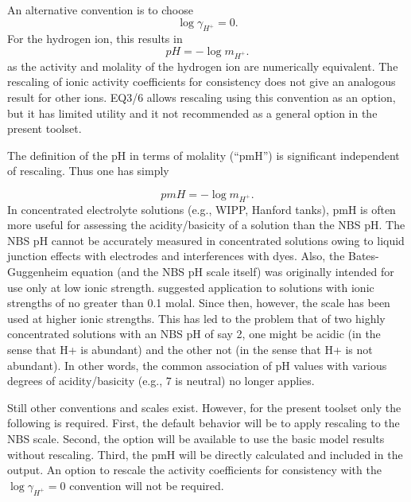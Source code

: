 An alternative convention is to choose
%
\begin{equation}
  \log \gamma _{H^{+}} = 0.
\end{equation}
%
For the hydrogen ion, this results in
% 
\begin{equation}
  pH = -\log m_{H^{+}} .
\end{equation}
%
as the activity and molality of the hydrogen ion are numerically
equivalent. The rescaling of ionic activity coefficients for
consistency does not give an analogous result for other ions. EQ3/6
allows rescaling using this convention as an option, but it has
limited utility and it not recommended as a general option in the
present toolset.

The definition of the pH in terms of molality (``pmH'') is significant independent of rescaling. Thus one has simply

\begin{equation}
  pmH = -\log m_{H^{+} } .
\end{equation}
%
In concentrated electrolyte solutions (e.g., WIPP, Hanford tanks), pmH
is often more useful for assessing the acidity/basicity of a solution
than the NBS pH. The NBS pH cannot be accurately measured in
concentrated solutions owing to liquid junction effects with
electrodes and interferences with dyes. Also, the Bates-Guggenheim
equation (and the NBS pH scale itself) was originally intended for use
only at low ionic strength. \citet{bates-1964} suggested application
to solutions with ionic strengths of no greater than 0.1 molal. Since
then, however, the scale has been used at higher ionic strengths. This
has led to the problem that of two highly concentrated solutions with
an NBS pH of say 2, one might be acidic (in the sense that H+ is
abundant) and the other not (in the sense that H+ is not abundant). In
other words, the common association of pH values with various degrees
of acidity/basicity (e.g., 7 is neutral) no longer applies.

Still other conventions and scales exist. However, for the present
toolset only the following is required. First, the default behavior
will be to apply rescaling to the NBS scale. Second, the option will
be available to use the basic model results without rescaling. Third,
the pmH will be directly calculated and included in the output. An
option to rescale the activity coefficients for consistency with the
$\log \gamma _{H^{+}} = 0$ convention will not be required.

 
